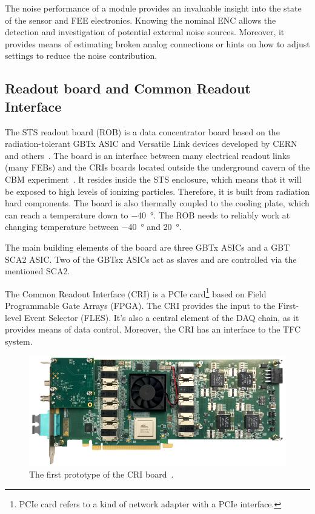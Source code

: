The noise performance of a module provides an invaluable insight into the state of the sensor and \gls{FEE} electronics. Knowing the nominal \gls{ENC} allows the detection and investigation of potential external noise sources. Moreover, it provides means of estimating broken analog connections or hints on how to adjust settings to reduce the noise contribution.
\subsection{Readout board and Common Readout Interface}

The \gls{STS} readout board (\gls{ROB}) is a data concentrator board based on the radiation-tolerant GBTx ASIC and Versatile Link
devices developed by CERN and others~\cite{Bonacini:1235849, C_2013}. The board is an interface between many electrical readout links (many \glspl{FEB}) and the \glspl{CRI} boards located outside the underground cavern of the \gls{CBM} experiment~\cite{Lehnert_2017}. It resides inside the \gls{STS} enclosure, which means that it will be exposed to high levels of ionizing particles. Therefore, it is built from radiation hard components. The board is also thermally coupled to the cooling plate, which can reach a temperature down to \SI{-40}{\degree}. The \gls{ROB} needs to reliably work at changing temperature between \SI{-40}{\degree} and \SI{20}{\degree}. 

The main building elements of the board are three \gls{GBT}x \glspl{ASIC} and a \gls{GBT} \gls{SCA2} \gls{ASIC}. Two of the \glspl{GBT}x \glspl{ASIC} act as slaves and are controlled via the mentioned \gls{SCA2}. 

The Common Readout Interface (\gls{CRI}) is a PCIe card\footnote{PCIe card refers to a kind of network adapter with a PCIe interface.} based on Field Programmable Gate Arrays (\gls{FPGA}). The \gls{CRI} provides the input to the First-level Event Selector (\gls{FLES}). It's also a central element of the \gls{DAQ} chain, as it provides means of data control. Moreover, the \gls{CRI} has an interface to the \gls{TFC} system. 
\begin{figure}[!h]
\centering
\includegraphics[width=0.8\columnwidth]{Chapter2/images/cri_board_atlas.pdf}
\caption{The first prototype of the \gls{CRI} board~\cite{CRI}.}
\label{fig_cri_board}
\end{figure}



